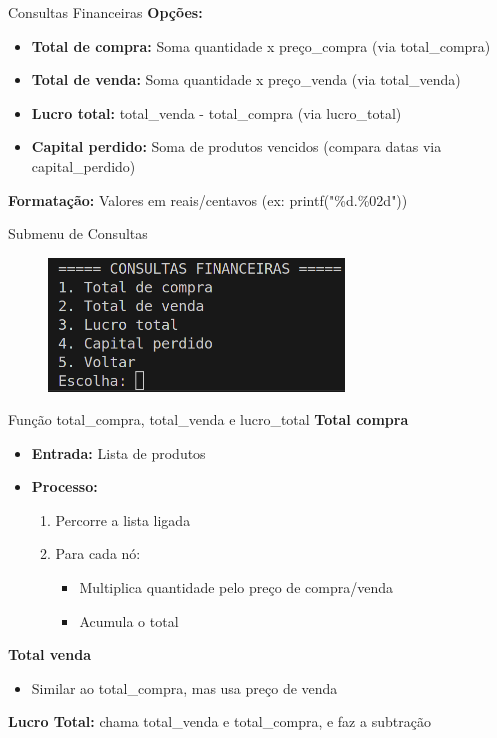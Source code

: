 \documentclass{beamer}
\begin{document}
\begin{frame}{Consultas Financeiras}
    \textbf{Opções:}
    \begin{itemize}
        \item \textbf{Total de compra:} Soma quantidade x preço\_compra (via total\_compra)
        \item \textbf{Total de venda:} Soma quantidade x preço\_venda (via total\_venda)
        \item \textbf{Lucro total:} total\_venda - total\_compra (via lucro\_total)
        \item \textbf{Capital perdido:} Soma de produtos vencidos (compara datas via capital\_perdido)
    \end{itemize}
    \vspace{0.5cm}
    \textbf{Formatação:} Valores em reais/centavos (ex: printf("\%d.\%02d"))
\end{frame}

\begin{frame}{Submenu de Consultas}
    \begin{figure}
        \centering
        \includegraphics[width=0.7\textwidth]{img/consulta-1.png}
    \end{figure}
\end{frame}

\begin{frame}{Função total\_compra, total\_venda e lucro\_total}
    \textbf{Total compra}
    \begin{itemize}
        \item \textbf{Entrada:} Lista de produtos
        \item \textbf{Processo:}
        \begin{enumerate}
            \item Percorre a lista ligada
            \item Para cada nó:
            \begin{itemize}
                \item Multiplica quantidade pelo preço de compra/venda
                \item Acumula o total
            \end{itemize}
        \end{enumerate}
    \end{itemize}

    \textbf{Total venda}
    \begin{itemize}
        \item Similar ao total\_compra, mas usa preço de venda
    \end{itemize}


    \textbf{Lucro Total:} chama total\_venda e total\_compra, e faz a subtração
\end{frame}
\end{document}
